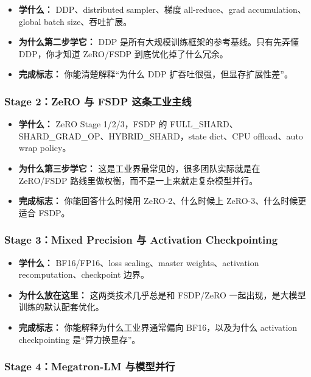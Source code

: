 \begin{itemize}[leftmargin=1.5em]
  \item \textbf{学什么：} DDP、distributed sampler、梯度 all-reduce、grad accumulation、global batch size、吞吐扩展。
  \item \textbf{为什么第二步学它：} DDP 是所有大规模训练框架的参考基线。只有先弄懂 DDP，你才知道 ZeRO/FSDP 到底优化掉了什么冗余。
  \item \textbf{完成标志：} 你能清楚解释“为什么 DDP 扩吞吐很强，但显存扩展性差”。
\end{itemize}

\subsubsection*{Stage 2：ZeRO 与 FSDP 这条工业主线}

\begin{itemize}[leftmargin=1.5em]
  \item \textbf{学什么：} ZeRO Stage 1/2/3，FSDP 的 FULL\_SHARD、SHARD\_GRAD\_OP、HYBRID\_SHARD，state dict、CPU offload、auto wrap policy。
  \item \textbf{为什么第三步学它：} 这是工业界最常见的，很多团队实际就是在 ZeRO/FSDP 路线里做权衡，而不是一上来就走复杂模型并行。
  \item \textbf{完成标志：} 你能回答什么时候用 ZeRO-2、什么时候上 ZeRO-3、什么时候更适合 FSDP。
\end{itemize}

\subsubsection*{Stage 3：Mixed Precision 与 Activation Checkpointing}

\begin{itemize}[leftmargin=1.5em]
  \item \textbf{学什么：} BF16/FP16、loss scaling、master weights、activation recomputation、checkpoint 边界。
  \item \textbf{为什么放在这里：} 这两类技术几乎总是和 FSDP/ZeRO 一起出现，是大模型训练的默认配套优化。
  \item \textbf{完成标志：} 你能解释为什么工业界通常偏向 BF16，以及为什么 activation checkpointing 是“算力换显存”。
\end{itemize}

\subsubsection*{Stage 4：Megatron-LM 与模型并行}


